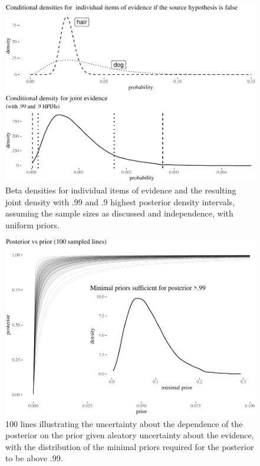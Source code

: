 \documentclass[
  10pt,
  dvipsnames,enabledeprecatedfontcommands]{scrartcl}
\begin{document}
\begin{figure}[H]

\begin{center}\includegraphics[width=0.8\linewidth]{chapter-outline_files/figure-latex/fig:densities-1} \end{center}
\caption{Beta densities for individual items of evidence and the resulting joint density with .99 and .9 highest posterior density intervals, assuming the sample sizes as discussed and independence, with uniform priors.}
\label{fig:densities}
\end{figure}

\begin{figure}[H]

\begin{center}\includegraphics[width=0.6\linewidth]{chapter-outline_files/figure-latex/fig:lines3-1} \end{center}

\caption{100 lines illustrating the uncertainty about the dependence of the posterior on the prior given aleatory uncertainty about the evidence, with the distribution of the minimal priors required for the posterior to be above .99.}

\label{fig:lines}

\end{figure}
\end{document}
